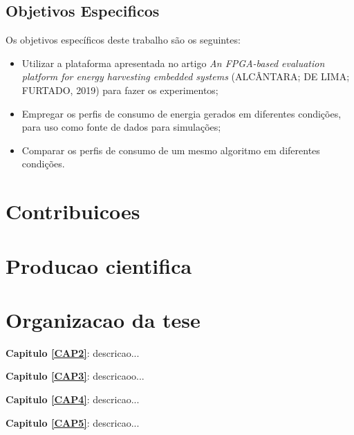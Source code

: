 \subsection{Objetivos Especificos}
Os objetivos específicos deste trabalho são os seguintes:
\begin{itemize}
    \item 	Utilizar a plataforma apresentada no artigo {\itshape An FPGA-based evaluation platform for energy harvesting embedded systems} (ALCÂNTARA; DE LIMA; FURTADO, 2019) para fazer os experimentos;
    
    \item 	Empregar os perfis de consumo de energia gerados em diferentes condições, para uso como fonte de dados para simulações;
     
     \item 	Comparar os perfis de consumo de um mesmo algoritmo em diferentes condições.

\end{itemize}


 
\section{Contribuicoes}




\section{Producao cientifica}


\section{Organizacao da tese}

\noindent \textbf{Capitulo \ref{CAP2}}: descricao...

\noindent \textbf{Capitulo \ref{CAP3}}: descricaoo...

\noindent \textbf{Capitulo \ref{CAP4}}: descricao...

\noindent \textbf{Capitulo \ref{CAP5}}: descricao...